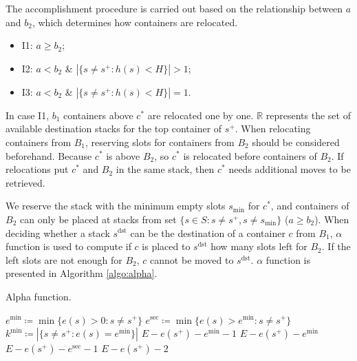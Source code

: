 \documentclass[review,3p,times,12pt,number]{elsarticle}\usepackage{amsmath}\usepackage{amssymb}
\renewcommand{\gets}{\coloneqq}
\newcommand{\mds}{s^\mathrm{dst}}
\newcommand{\setalgo}{\linespread{1}\fontsize{10}{12}\selectfont}
\begin{document}
The accomplishment procedure is carried out based on the relationship between $a$ and $b_2$, which determines how containers are relocated.
\begin{itemize}
\item I1: $a\ge b_2$;
\item I2: $a<b_2$ \& $|\{s\neq s^+: h(s)<H\}|>1$;
\item I3: $a<b_2$ \& $|\{s\neq s^+: h(s)<H\}|=1$.
\end{itemize}

In case I1, $b_1$ containers above $c^*$ are relocated one by one. $\mathbb R$ represents the set of available destination stacks for the top container of $s^+$.
When relocating containers from $B_1$, reserving slots for containers from $B_2$ should be considered beforehand. Because $c^*$ is above $B_2$, so $c^*$ is relocated before containers of $B_2$.
If relocations put $c^*$ and $B_2$ in the same stack, then $c^*$ needs additional moves to be retrieved.

We reserve the stack with the minimum empty slots $s_{\text{min}}$ for $c^*$, and containers of $B_2$ can only be placed at stacks from set $\{s\in S: s\neq s^+, s\neq s_\text{min}\}$ ($a\ge b_2$).
When deciding whether a stack $s^{\text{dst}}$ can be the destination of a container $c$ from $B_1$, $\alpha$ function is used to compute if $c$ is placed to $s^{\text{dst}}$ how many slots left for $B_2$.
If the left slots are not enough for $B_2$, $c$ cannot be moved to $s^{\text{dst}}$.
$\alpha$ function is presented in Algorithm \ref{algo:alpha}.
\begin{algorithm}[htbp]

\caption{Alpha function.}
\label{algo:alpha}
\setalgo
\begin{multicols}{2}
\Function{$\alpha(s^+,\mds)$}
        {\tcp{$s^+\neq \mds$}
            $e^{\min}\gets \min\{e(s)>0:s\neq s^+\}$\;
            $e^{\sec}\gets \min\{e(s)>e^{\min}:s\neq s^+\}$\;
            $k^{\min}\gets |\{s\neq s^+ : e(s)=e^{\min}\}|$\;
            \uIf{$e(\mds)> e^{\min}$}
            {
                \Return $E-e(s^+)-e^{\min}-1$\;
            }
            {
                \Return $E-e(s^+)-e^{\min}$\;
            }
            {
                \Return $E-e(s^+)-e^{\sec}-1$\;
            }
            \Else
            {
                \Return $E-e(s^+)-2$\;
            }
        }
\end{multicols}
\BlankLine
\BlankLine
\end{algorithm}
\end{document}
